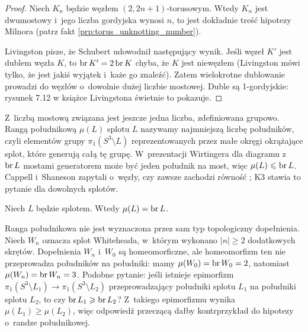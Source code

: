 \begin{proof}
    Niech $K_n$ będzie węzłem $(2, 2n+1)$-torusowym.
    Wtedy $K_n$ jest dwumostowy i~jego liczba gordyjska wynosi $n$, to jest dokładnie treść hipotezy Milnora (patrz fakt \ref{prp:torus_unknotting_number}).

    Livingston pisze, że Schubert \cite[s. 281]{schubert1954} udowodnił następujący wynik.
    Jeśli węzeł $K'$ jest dublem węzła $K$, to $\operatorname{br} K' = 2 \operatorname{br} K$ chyba, że $K$ jest niewęzłem (Livingston mówi tylko, że jest jakiś wyjątek i~każe go znaleźć).
    Zatem wielokrotne dublowanie prowadzi do węzłów o~dowolnie dużej liczbie mostowej.
    Duble są 1-gordyjskie: rysunek 7.12 w książce Livingstona \cite[s. 146]{livingston1993} świetnie to pokazuje.
\end{proof}

Z~liczbą mostową związana jest jeszcze jedna liczba, zdefiniowana grupowo.
Rangą południkową $\mu(L)$ splotu $L$ nazywamy najmniejszą liczbę południków, czyli elementów grupy $\pi_1(S^3 \setminus L)$ reprezentowanych przez małe okręgi okrążające splot, które generują całą tę grupę.
%
W~prezentacji Wirtingera dla diagramu z~$\operatorname{br} L$ mostami generatorem może być jeden południk na most, więc $\mu(L) \leqslant \operatorname{br} L$.
Cappell i~Shaneson zapytali o~węzły, czy zawsze zachodzi równość \cite[problem 1.11]{kirby1997}; K3 \cite[problem 1.18]{baykur2026} stawia to pytanie dla dowolnych splotów.
%
%

\begin{conjecture}
%
    Niech $L$ będzie splotem.
    Wtedy $\mu(L) = \operatorname{br} L$.
\end{conjecture}

Ranga południkowa nie jest wyznaczona przez sam typ topologiczny dopełnienia.
Niech $W_n$ oznacza splot Whiteheada, w~którym wykonano $|n| \ge 2$ dodatkowych skrętów.
Dopełnienia $W_n$ i~$W_0$ są homeomorficzne, ale homeomorfizm ten nie przeprowadza południków na południki: mamy $\mu(W_0) = \operatorname{br} W_0 = 2$, natomiast $\mu(W_n) = \operatorname{br} W_n = 3$.
Podobne pytanie: jeśli istnieje epimorfizm $\pi_1(S^3 \setminus L_1) \to \pi_1(S^3 \setminus L_2)$ przeprowadzający południki splotu $L_1$ na południki splotu $L_2$, to czy $\operatorname{br} L_1 \geqslant \operatorname{br} L_2$?
Z~takiego epimorfizmu wynika $\mu(L_1) \ge \mu(L_2)$, więc odpowiedź przeczącą dałby kontrprzykład do hipotezy o~randze południkowej.


%


